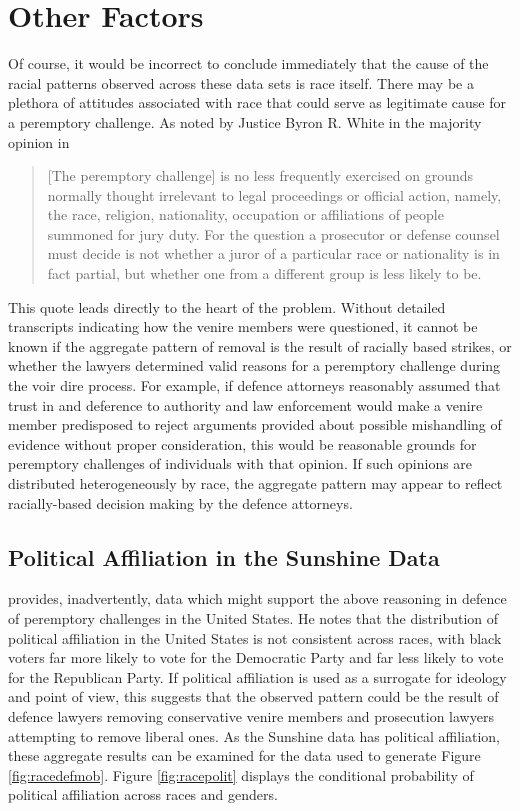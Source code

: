\section{Other Factors} \label{sec:otherfact}

Of course, it would be incorrect to conclude immediately that the cause of the racial patterns observed across these data sets is
race itself. There may be a plethora of attitudes associated with race that could serve as legitimate cause for a peremptory
challenge. As noted by Justice Byron R. White in the majority opinion in \cite{swainvalabama}

\begin{quote}
  [The peremptory challenge] is no less frequently exercised on grounds normally thought irrelevant to legal proceedings or
  official action, namely, the race, religion, nationality, occupation or affiliations of people summoned for jury duty. For the
  question a prosecutor or defense counsel must decide is not whether a juror of a particular race or nationality is in fact
  partial, but whether one from a different group is less likely to be.
\end{quote}

This quote leads directly to the heart of the problem. Without detailed transcripts indicating how the venire members were
questioned, it cannot be known if the aggregate pattern of removal is the result of racially based strikes, or whether the lawyers
determined valid reasons for a peremptory challenge during the voir dire process. For example, if defence attorneys reasonably
assumed that trust in and deference to authority and law enforcement would make a venire member predisposed to reject arguments
provided about possible mishandling of evidence without proper consideration, this would be reasonable grounds for peremptory
challenges of individuals with that opinion. If such opinions are distributed heterogeneously by race, the aggregate pattern may
appear to reflect racially-based decision making by the defence attorneys. 

\subsection{Political Affiliation in the Sunshine Data}

\cite{revesz2016} provides, inadvertently, data which might support the above reasoning in defence of peremptory challenges in the
United States. He notes that the distribution of political affiliation in the United States is not consistent across races, with
black voters far more likely to vote for the Democratic Party and far less likely to vote for the Republican Party. If political
affiliation is used as a surrogate for ideology and point of view, this suggests that the observed pattern could be the result of
defence lawyers removing conservative venire members and prosecution lawyers attempting to remove liberal ones. As the Sunshine
data has political affiliation, these aggregate results can be examined for the data used to generate Figure
\ref{fig:racedefmob}. Figure \ref{fig:racepolit} displays the conditional probability of political affiliation across races and
genders.

